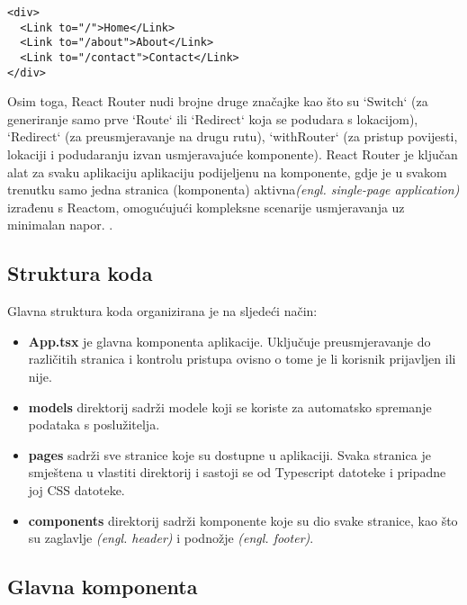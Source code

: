 \documentclass[times, utf8, zavrsni]{fer}
\begin{document}
\begin{verbatim}
<div>
  <Link to="/">Home</Link>
  <Link to="/about">About</Link>
  <Link to="/contact">Contact</Link>
</div>
\end{verbatim}
Osim toga, React Router nudi brojne druge značajke kao što su `Switch` (za generiranje samo prve `Route` ili `Redirect` koja se podudara s lokacijom), `Redirect` (za preusmjeravanje na drugu rutu), `withRouter` (za pristup povijesti, lokaciji i podudaranju izvan usmjeravajuće komponente). React Router je ključan alat za svaku aplikaciju aplikaciju podijeljenu na komponente, gdje je u svakom trenutku samo jedna stranica (komponenta) aktivna\textit{(engl. single-page application)} izrađenu s Reactom, omogućujući kompleksne scenarije usmjeravanja uz minimalan napor.
.
\newpage
\subsection{Struktura koda}

Glavna struktura koda organizirana je na sljedeći način:

\begin{itemize}
    \item \textbf{App.tsx} je glavna komponenta aplikacije. Uključuje preusmjeravanje do različitih stranica i kontrolu pristupa ovisno o tome je li korisnik prijavljen ili nije.
    \item \textbf{models} direktorij sadrži modele koji se koriste za automatsko spremanje podataka s poslužitelja.
    \item \textbf{pages} sadrži sve stranice koje su dostupne u aplikaciji. Svaka stranica je smještena u vlastiti direktorij i sastoji se od Typescript datoteke i pripadne joj CSS datoteke.
    \item \textbf{components} direktorij sadrži  komponente koje su dio svake stranice, kao što su zaglavlje \textit{(engl. header)} i podnožje \textit{(engl. footer)}.
\end{itemize}

\subsection{Glavna komponenta}
\end{document}
